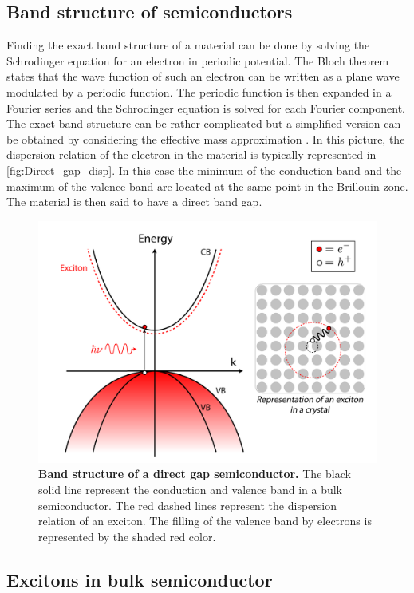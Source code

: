 \subsection{Band structure of semiconductors}

Finding the exact band structure of a material can be done by solving the Schrodinger equation for an electron in periodic potential.
 The Bloch theorem states that the wave function of such an electron can be written as a plane wave modulated by a periodic function. The periodic function is then expanded in a Fourier series and the Schrodinger equation is solved for each Fourier component. 
 The exact band structure can be rather complicated but a simplified version can be obtained by considering the effective mass approximation \cite{kittel_introduction_2005}. In this picture, the dispersion relation of the electron in the material is typically represented in \autoref{fig:Direct_gap_disp}.
In this case the minimum of the conduction band and the maximum of the valence band are located at the same point in the Brillouin zone. The material is then said to have a direct band gap.
\begin{figure}[h]
    \centering
    \includegraphics[width=0.8\linewidth]{chap1/fig/DirectGapDisp.png}
    \caption{\textbf{Band structure of a direct gap semiconductor.} The black solid line represent the conduction and valence band in a bulk semiconductor. The red dashed lines represent the dispersion relation of an exciton. The filling of the valence band by electrons is represented by the shaded red color.}
    \label{fig:Direct_gap_disp}
\end{figure}


\subsection{Excitons in bulk semiconductor}

